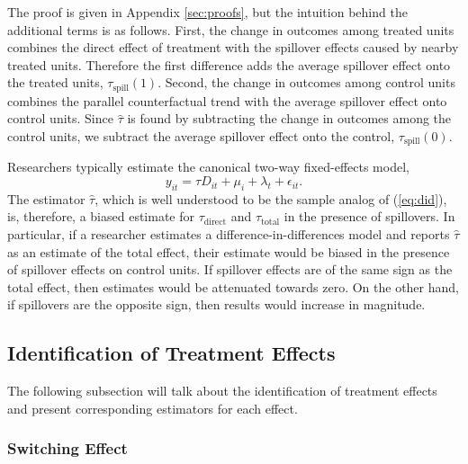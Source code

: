 \documentclass[11pt]{article}
\begin{document}
The proof is given in Appendix \ref{sec:proofs}, but the intuition behind the additional terms is as follows. First, the change in outcomes among treated units combines the direct effect of treatment with the spillover effects caused by nearby treated units. Therefore the first difference adds the average spillover effect onto the treated units, $\tau_{\text{spill}}(1)$. Second, the change in outcomes among control units combines the parallel counterfactual trend with the average spillover effect onto control units. Since $\hat{\tau}$ is found by subtracting the change in outcomes among the control units, we subtract the average spillover effect onto the control, $\tau_{\text{spill}}(0)$. 

Researchers typically estimate the canonical two-way fixed-effects model, 
\begin{equation}\label{eq:twfe}    
    y_{it} = \tau D_{it} + \mu_i + \lambda_t + \epsilon_{it}.
\end{equation}
The estimator $\hat{\tau}$, which is well understood to be the sample analog of (\ref{eq:did}), is, therefore, a biased estimate for $\tau_{\text{direct}}$ and $\tau_{\text{total}}$ in the presence of spillovers. In particular, if a researcher estimates a difference-in-differences model and reports $\hat{\tau}$ as an estimate of the total effect, their estimate would be biased in the presence of spillover effects on control units. If spillover effects are of the same sign as the total effect, then estimates would be attenuated towards zero. On the other hand, if spillovers are the opposite sign, then results would increase in magnitude. 

\subsection{Identification of Treatment Effects}\label{sec:remove_bias}

The following subsection will talk about the identification of treatment effects and present corresponding estimators for each effect. 

\subsubsection{Switching Effect}
\end{document}
